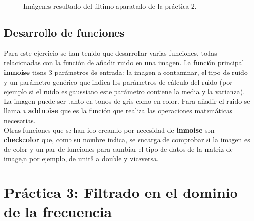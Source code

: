 \documentclass[a4paper,12pt]{report}
\begin{document}
\begin{figure}[!tbp]
  \centering
  \hfill
  \caption{Imágenes resultado del último aparatado de la práctica 2.}
  \label{p2final}
\end{figure}


\subsection{Desarrollo de funciones}

Para este ejercicio se han tenido que desarrollar varias funciones, todas relacionadas con la función de añadir ruido en una imagen. La función principal \textbf{imnoise} tiene 3 parámetros de entrada: la imagen a contaminar, el tipo de ruido y un parámetro genérico que indica los parámetros de cálculo del ruido (por ejemplo si el ruido es gaussiano este parámetro contiene la media y la varianza). La imagen puede ser tanto en tonos de gris como en color. Para añadir el ruido se llama a \textbf{addnoise} que es la función que realiza las operaciones matemáticas necesarias.\\

Otras funciones que se han ido creando por necesidad de \textbf{imnoise} son \textbf{checkcolor} que, como su nombre indica, se encarga de comprobar si la imagen es de color y un par de funciones para cambiar el tipo de datos de la matriz de image,n por ejemplo, de unit8 a double y viceversa.

\section{Práctica 3: Filtrado en el dominio de la frecuencia}
\end{document}
